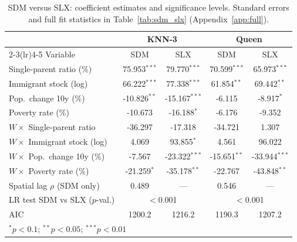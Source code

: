\begin{table}[ht]
\centering
\caption{SDM versus SLX: coefficient estimates and significance levels. Standard errors and full fit statistics in Table~\ref{tab:sdm_slx} (Appendix~\ref{app:full}).}
\label{tab:sdm_slx_compact}
\begin{tabular}{lcccc}
  \toprule
  & \multicolumn{2}{c}{\textbf{KNN-3}} & \multicolumn{2}{c}{\textbf{Queen}} \\
  \cmidrule(lr){2-3}\cmidrule(lr){4-5}
  Variable & SDM & SLX & SDM & SLX \\
  \midrule
  Single-parent ratio (\%) & 75.953$^{***}$ & 79.770$^{***}$ & 70.599$^{***}$ & 65.973$^{***}$ \\
  Immigrant stock (log) & 66.222$^{***}$ & 77.338$^{***}$ & 61.854$^{**}$ & 69.442$^{**}$ \\
  Pop.~change 10y (\%) & -10.826$^{**}$ & -15.167$^{***}$ & -6.115 & -8.917$^{*}$ \\
  Poverty rate (\%) & -10.673 & -16.188$^{*}$ & -6.176 & -9.352 \\
  \midrule
  $W\!\times\!$ Single-parent ratio & -36.297 & -17.318 & -34.721 & 1.307 \\
  $W\!\times\!$ Immigrant stock (log) & 4.069 & 93.855$^{*}$ & 4.561 & 96.022 \\
  $W\!\times\!$ Pop.~change 10y (\%) & -7.567 & -23.322$^{***}$ & -15.651$^{**}$ & -33.944$^{***}$ \\
  $W\!\times\!$ Poverty rate (\%) & -21.259$^{*}$ & -35.178$^{**}$ & -22.767 & -43.848$^{**}$ \\
  \midrule
  Spatial lag $\rho$ (SDM only) & 0.489 & --- & 0.546 & --- \\
  LR test SDM vs SLX ($p$-val.) & \multicolumn{2}{c}{$<$0.001} & \multicolumn{2}{c}{$<$0.001} \\
  AIC & 1200.2 & 1216.2 & 1190.3 & 1207.2 \\
  \bottomrule
  \multicolumn{5}{l}{\scriptsize $^{*}p<0.1$;\; $^{**}p<0.05$;\; $^{***}p<0.01$} \\
\end{tabular}
\end{table}
